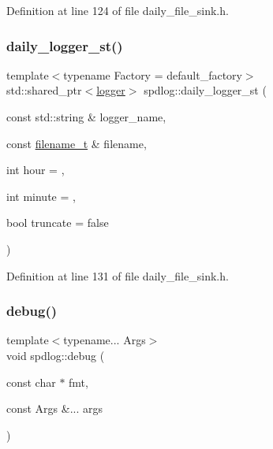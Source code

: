 Definition at line 124 of file daily\+\_\+file\+\_\+sink.\+h.

\mbox{\label{namespacespdlog_a887beb44c55ef32f4bc62fa16451c77e}} 
\subsubsection{\texorpdfstring{daily\+\_\+logger\+\_\+st()}{daily\_logger\_st()}}
{\footnotesize\ttfamily template$<$typename Factory  = default\+\_\+factory$>$ \\
std\+::shared\+\_\+ptr$<$\hyperlink{classspdlog_1_1logger}{logger}$>$ spdlog\+::daily\+\_\+logger\+\_\+st (\begin{DoxyParamCaption}\item[{const std\+::string \&}]{logger\+\_\+name,  }\item[{const \hyperlink{namespacespdlog_acf7ce125b3622e44f8f1702d699e0b06}{filename\+\_\+t} \&}]{filename,  }\item[{int}]{hour = {},  }\item[{int}]{minute = {},  }\item[{bool}]{truncate = {\ttfamily false} }\end{DoxyParamCaption})\hspace{0.3cm}{\ttfamily [inline]}}



Definition at line 131 of file daily\+\_\+file\+\_\+sink.\+h.

\mbox{\label{namespacespdlog_a29e62b80052a1440e526853d4b2c3c5c}} 
\subsubsection{\texorpdfstring{debug()}{debug()}\hspace{0.1cm}{\footnotesize\ttfamily [1/2]}}
{\footnotesize\ttfamily template$<$typename... Args$>$ \\
void spdlog\+::debug (\begin{DoxyParamCaption}\item[{const char $\ast$}]{fmt,  }\item[{const Args \&...}]{args }\end{DoxyParamCaption})\hspace{0.3cm}{\ttfamily [inline]}}




